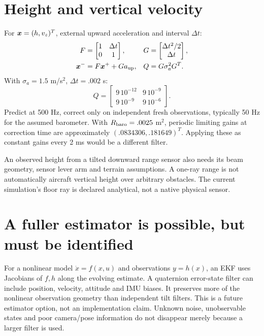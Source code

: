 \section{Height and vertical velocity}
For $\bm{x}=(h,v_z)^T$, external upward acceleration and interval $\Delta t$:
\begin{align}
F&=\begin{bmatrix}1&\Delta t\\0&1\end{bmatrix},&
G&=\begin{bmatrix}\Delta t^2/2\\\Delta t\end{bmatrix},\\
\bm{x}^-&=F\bm{x}^++Ga_{\rm up},&
Q&=G\sigma_a^2G^T.
\end{align}
With $\sigma_a=1.5$ m/s$^2$, $\Delta t=.002$ s:
\begin{equation}
Q=\begin{bmatrix}9\,10^{-12}&9\,10^{-9}\\9\,10^{-9}&9\,10^{-6}\end{bmatrix}.
\end{equation}
Predict at 500 Hz, correct only on independent fresh observations, typically
50 Hz for the assumed barometer. With $R_{\rm baro}=.0025$ m$^2$, periodic
limiting gains at correction time are approximately $(.0834306,.181649)^T$.
Applying these as constant gains every 2 ms would be a different filter.

An observed height from a tilted downward range sensor also needs its beam
geometry, sensor lever arm and terrain assumptions. A one-ray range is not
automatically aircraft vertical height over arbitrary obstacles. The current
simulation's floor ray is declared analytical, not a native physical sensor.

\section{A fuller estimator is possible, but must be identified}
For a nonlinear model $\dot x=f(x,u)$ and observations $y=h(x)$, an EKF uses
Jacobians of $f,h$ along the evolving estimate. A quaternion error-state filter
can include position, velocity, attitude and IMU biases. It preserves more of
the nonlinear observation geometry than independent tilt filters.
This is a future estimator option, not an implementation claim. Unknown noise,
unobservable states and poor camera/pose information do not disappear merely
because a larger filter is used.
